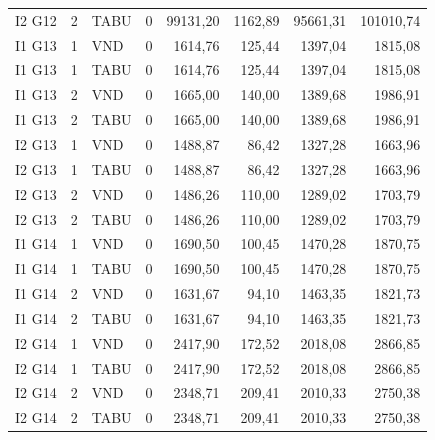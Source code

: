 \begin{longtable}{lrlrrrrr}
I2 G12 & 2 & TABU & 0 & 99131,20 & 1162,89 & 95661,31 & 101010,74 \\
I1 G13 & 1 & VND & 0 & 1614,76 & 125,44 & 1397,04 & 1815,08 \\
I1 G13 & 1 & TABU & 0 & 1614,76 & 125,44 & 1397,04 & 1815,08 \\
I1 G13 & 2 & VND & 0 & 1665,00 & 140,00 & 1389,68 & 1986,91 \\
I1 G13 & 2 & TABU & 0 & 1665,00 & 140,00 & 1389,68 & 1986,91 \\
I2 G13 & 1 & VND & 0 & 1488,87 & 86,42 & 1327,28 & 1663,96 \\
I2 G13 & 1 & TABU & 0 & 1488,87 & 86,42 & 1327,28 & 1663,96 \\
I2 G13 & 2 & VND & 0 & 1486,26 & 110,00 & 1289,02 & 1703,79 \\
I2 G13 & 2 & TABU & 0 & 1486,26 & 110,00 & 1289,02 & 1703,79 \\
I1 G14 & 1 & VND & 0 & 1690,50 & 100,45 & 1470,28 & 1870,75 \\
I1 G14 & 1 & TABU & 0 & 1690,50 & 100,45 & 1470,28 & 1870,75 \\
I1 G14 & 2 & VND & 0 & 1631,67 & 94,10 & 1463,35 & 1821,73 \\
I1 G14 & 2 & TABU & 0 & 1631,67 & 94,10 & 1463,35 & 1821,73 \\
I2 G14 & 1 & VND & 0 & 2417,90 & 172,52 & 2018,08 & 2866,85 \\
I2 G14 & 1 & TABU & 0 & 2417,90 & 172,52 & 2018,08 & 2866,85 \\
I2 G14 & 2 & VND & 0 & 2348,71 & 209,41 & 2010,33 & 2750,38 \\
I2 G14 & 2 & TABU & 0 & 2348,71 & 209,41 & 2010,33 & 2750,38 \\
\bottomrule\end{longtable}
